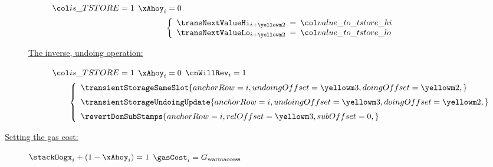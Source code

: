 \begin{description}
\begin{description}
				\If $\locIsTstore = 1$  \et $\xAhoy_{i} = 0$ \Then
				\[
					\left\{ \begin{array}{lcl}
						\transNextValueHi _{i + \locTransientDoingRow} & \!\!\! = \!\!\! & \locTransientValueToStoreHi \\
						\transNextValueLo _{i + \locTransientDoingRow} & \!\!\! = \!\!\! & \locTransientValueToStoreLo \\
					\end{array} \right.
				\]
			\item[\underline{The inverse, undoing operation:}]
				\If $\locIsTstore = 1$  \et $\xAhoy_{i} = 0$ \et $\cnWillRev_{i} = 1$ \Then
				\[
					\left\{ \begin{array}{lcl}
						\transientStorageSameSlot {
							anchorRow     = i                       ,
							undoingOffset = \locTransientUndoingRow ,
							doingOffset   = \locTransientDoingRow   ,
						}
						\vspace{2mm} \\
						\transientStorageUndoingUpdate {
							anchorRow     = i                       ,
							undoingOffset = \locTransientUndoingRow ,
							doingOffset   = \locTransientDoingRow   ,
						}
						\vspace{2mm} \\
						\revertDomSubStamps {
							anchorRow        = i,
							relOffset        = \locTransientUndoingRow,
							subOffset        = 0,
						} \\
					\end{array} \right.
				\]
		\end{description}
	\item[\underline{Setting the gas cost:}]
		\If $\stackOogx_{i} + (1 - \xAhoy_{i}) = 1$ \Then $\gasCost_{i} = G_{\text{warmaccess}}$
\end{description}
